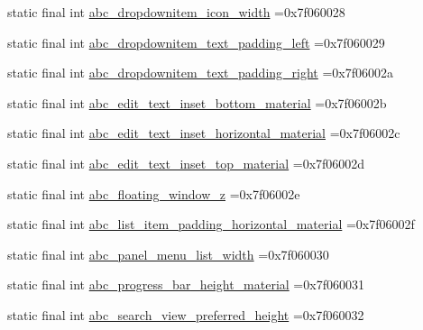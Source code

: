 \begin{DoxyCompactItemize}
\item 
static final int \mbox{\hyperlink{classbr_1_1unb_1_1cic_1_1mp_1_1marketmaster_1_1R_1_1dimen_ad612b7771195cad4783653eb1e15ee68}{abc\+\_\+dropdownitem\+\_\+icon\+\_\+width}} =0x7f060028
\item 
static final int \mbox{\hyperlink{classbr_1_1unb_1_1cic_1_1mp_1_1marketmaster_1_1R_1_1dimen_a6985f5a3e22e08b067a438f869301db1}{abc\+\_\+dropdownitem\+\_\+text\+\_\+padding\+\_\+left}} =0x7f060029
\item 
static final int \mbox{\hyperlink{classbr_1_1unb_1_1cic_1_1mp_1_1marketmaster_1_1R_1_1dimen_a4ca1d882f4dadf28b251673103ffbd7c}{abc\+\_\+dropdownitem\+\_\+text\+\_\+padding\+\_\+right}} =0x7f06002a
\item 
static final int \mbox{\hyperlink{classbr_1_1unb_1_1cic_1_1mp_1_1marketmaster_1_1R_1_1dimen_a38cebac6d16ce407fbfc7f497c25b54b}{abc\+\_\+edit\+\_\+text\+\_\+inset\+\_\+bottom\+\_\+material}} =0x7f06002b
\item 
static final int \mbox{\hyperlink{classbr_1_1unb_1_1cic_1_1mp_1_1marketmaster_1_1R_1_1dimen_adda70a844200f23a2c863460b3fabb37}{abc\+\_\+edit\+\_\+text\+\_\+inset\+\_\+horizontal\+\_\+material}} =0x7f06002c
\item 
static final int \mbox{\hyperlink{classbr_1_1unb_1_1cic_1_1mp_1_1marketmaster_1_1R_1_1dimen_a473bc0c2f4cc46160f2e8d1a53bf0944}{abc\+\_\+edit\+\_\+text\+\_\+inset\+\_\+top\+\_\+material}} =0x7f06002d
\item 
static final int \mbox{\hyperlink{classbr_1_1unb_1_1cic_1_1mp_1_1marketmaster_1_1R_1_1dimen_a53d75777e7d5e6fc408728a26c9ac72e}{abc\+\_\+floating\+\_\+window\+\_\+z}} =0x7f06002e
\item 
static final int \mbox{\hyperlink{classbr_1_1unb_1_1cic_1_1mp_1_1marketmaster_1_1R_1_1dimen_a0c6d51a28ee3e8dd7f70b466613dcaa0}{abc\+\_\+list\+\_\+item\+\_\+padding\+\_\+horizontal\+\_\+material}} =0x7f06002f
\item 
static final int \mbox{\hyperlink{classbr_1_1unb_1_1cic_1_1mp_1_1marketmaster_1_1R_1_1dimen_aab36685e97f25386798afb9ed94e453d}{abc\+\_\+panel\+\_\+menu\+\_\+list\+\_\+width}} =0x7f060030
\item 
static final int \mbox{\hyperlink{classbr_1_1unb_1_1cic_1_1mp_1_1marketmaster_1_1R_1_1dimen_a6a142212d94c5c497b8f39debbd6ef49}{abc\+\_\+progress\+\_\+bar\+\_\+height\+\_\+material}} =0x7f060031
\item 
static final int \mbox{\hyperlink{classbr_1_1unb_1_1cic_1_1mp_1_1marketmaster_1_1R_1_1dimen_ae1f20c76f5dcbf23e19a0ee87a7bb9c8}{abc\+\_\+search\+\_\+view\+\_\+preferred\+\_\+height}} =0x7f060032

\end{DoxyCompactItemize}
